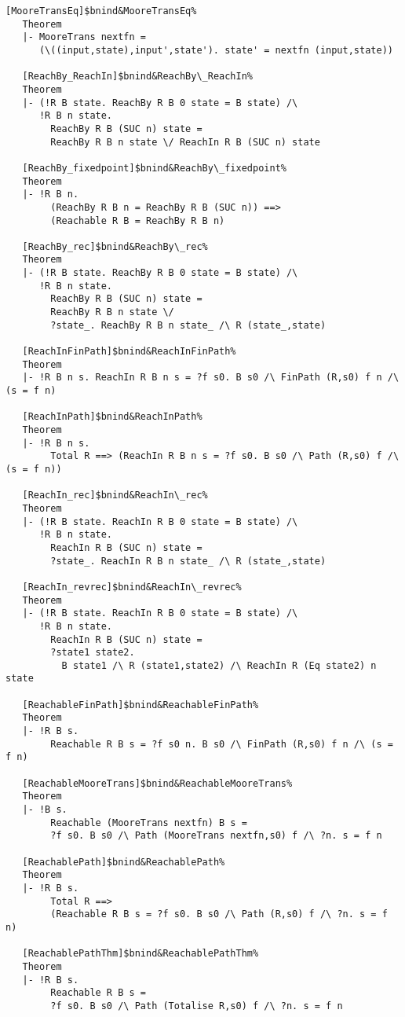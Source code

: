 \documentclass[12pt]{article}
\begin{document}
\begin{footnotesize}
\begin{Verbatim}[commandchars=\$\&\%]
   [MooreTransEq]$bnind&MooreTransEq%
   Theorem
   |- MooreTrans nextfn =
      (\((input,state),input',state'). state' = nextfn (input,state))
   
   [ReachBy_ReachIn]$bnind&ReachBy\_ReachIn%
   Theorem
   |- (!R B state. ReachBy R B 0 state = B state) /\
      !R B n state.
        ReachBy R B (SUC n) state =
        ReachBy R B n state \/ ReachIn R B (SUC n) state
   
   [ReachBy_fixedpoint]$bnind&ReachBy\_fixedpoint%
   Theorem
   |- !R B n.
        (ReachBy R B n = ReachBy R B (SUC n)) ==>
        (Reachable R B = ReachBy R B n)
   
   [ReachBy_rec]$bnind&ReachBy\_rec%
   Theorem
   |- (!R B state. ReachBy R B 0 state = B state) /\
      !R B n state.
        ReachBy R B (SUC n) state =
        ReachBy R B n state \/
        ?state_. ReachBy R B n state_ /\ R (state_,state)
   
   [ReachInFinPath]$bnind&ReachInFinPath%
   Theorem
   |- !R B n s. ReachIn R B n s = ?f s0. B s0 /\ FinPath (R,s0) f n /\ (s = f n)
   
   [ReachInPath]$bnind&ReachInPath%
   Theorem
   |- !R B n s.
        Total R ==> (ReachIn R B n s = ?f s0. B s0 /\ Path (R,s0) f /\ (s = f n))
   
   [ReachIn_rec]$bnind&ReachIn\_rec%
   Theorem
   |- (!R B state. ReachIn R B 0 state = B state) /\
      !R B n state.
        ReachIn R B (SUC n) state =
        ?state_. ReachIn R B n state_ /\ R (state_,state)
   
   [ReachIn_revrec]$bnind&ReachIn\_revrec%
   Theorem
   |- (!R B state. ReachIn R B 0 state = B state) /\
      !R B n state.
        ReachIn R B (SUC n) state =
        ?state1 state2.
          B state1 /\ R (state1,state2) /\ ReachIn R (Eq state2) n state
   
   [ReachableFinPath]$bnind&ReachableFinPath%
   Theorem
   |- !R B s.
        Reachable R B s = ?f s0 n. B s0 /\ FinPath (R,s0) f n /\ (s = f n)
   
   [ReachableMooreTrans]$bnind&ReachableMooreTrans%
   Theorem
   |- !B s.
        Reachable (MooreTrans nextfn) B s =
        ?f s0. B s0 /\ Path (MooreTrans nextfn,s0) f /\ ?n. s = f n
   
   [ReachablePath]$bnind&ReachablePath%
   Theorem
   |- !R B s.
        Total R ==>
        (Reachable R B s = ?f s0. B s0 /\ Path (R,s0) f /\ ?n. s = f n)
   
   [ReachablePathThm]$bnind&ReachablePathThm%
   Theorem
   |- !R B s.
        Reachable R B s =
        ?f s0. B s0 /\ Path (Totalise R,s0) f /\ ?n. s = f n
   

\end{Verbatim}
\end{footnotesize}
\end{document}
